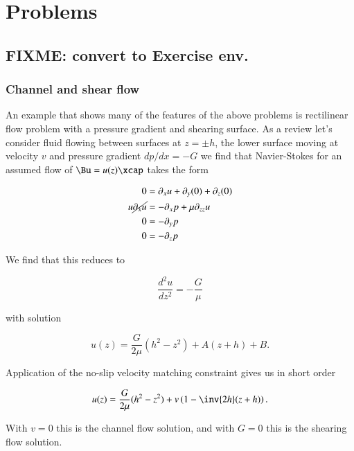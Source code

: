 \chapter{Problems}
\section{FIXME: convert to Exercise env.}
\subsection{Channel and shear flow}

An example that shows many of the features of the above problems is rectilinear flow problem with a pressure gradient and shearing surface.  As a review let's consider fluid flowing between surfaces at $z = \pm h$, the lower surface moving at velocity $v$ and pressure gradient $dp/dx = -G$ we find that Navier-Stokes for an assumed flow of $\Bu = u(z) \xcap$ takes the form

\begin{align}\label{eqn:continuumFluidsReview:1270}
0 &= \partial_x u + \partial_y (0) + \partial_z (0) \\
u \cancel{\partial_x u} &= - \partial_x p + \mu \partial_{zz} u \\
0 &= -\partial_y p \\
0 &= -\partial_z p
\end{align}

We find that this reduces to 

\begin{equation}\label{eqn:continuumFluidsReview:1290}
\frac{d^2 u}{dz^2} = -\frac{G}{\mu}
\end{equation}

with solution

\begin{equation}\label{eqn:continuumFluidsReview:1310}
u(z) = \frac{G}{2\mu}(h^2 - z^2) + A (z + h) + B.
\end{equation}

Application of the no-slip velocity matching constraint gives us in short order

\begin{equation}\label{eqn:continuumFluidsReview:1330}
u(z) = \frac{G}{2\mu}(h^2 - z^2) + v \left( 1 - \inv{2h} (z + h) \right).
\end{equation}

With $v = 0$ this is the channel flow solution, and with $G = 0$ this is the shearing flow solution.


